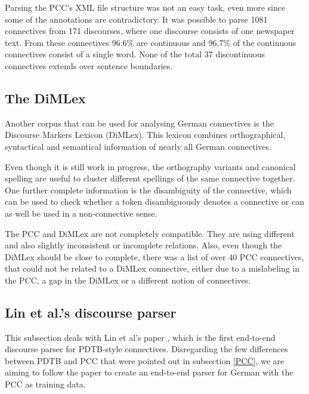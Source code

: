 \documentclass[10pt,a4paper]{article}
\begin{document}
Parsing the PCC's XML file structure was not an easy task, even more since some of the annotations are contradictory. It was possible to parse 1081 connectives from 171 discourses, where one discourse consists of one newspaper text. From these connectives 96.6\% are continuous and 96.7\% of the continuous connectives consist of a single word. None of the total 37 discontinuous connectives extends over sentence boundaries.

\subsection{The DiMLex}

Another corpus that can be used for analysing German connectives is the Discourse Markers Lexicon (DiMLex). This lexicon combines orthographical, syntactical and semantical information of nearly all German connectives.

Even though it is still work in progress, the orthography variants and canonical spelling are useful to cluster different spellings of the same connective together. One further complete information is the disambiguity of the connective, which can be used to check whether a token disambiguously denotes a connective or can as well be used in a non-connective sense.

The PCC and DiMLex are not completely compatible. They are using different and also slightly inconsistent or incomplete relations. Also, even though the DiMLex should be close to complete, there was a list of over 40 PCC connectives, that could not be related to a DiMLex connective, either due to a mislabeling in the PCC, a gap in the DiMLex or a different notion of connectives.

\subsection{Lin et al.'s discourse parser}

This subsection deals with Lin et al's paper \cite{Lin12}, which is the first end-to-end discourse parser for PDTB-style connectives. Disregarding the few differences between PDTB and PCC that were pointed out in subsection \ref{PCC}, we are aiming to follow the paper to create an end-to-end parser for German with the PCC as training data.
\end{document}
